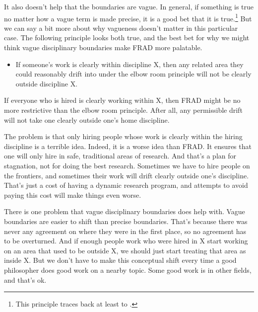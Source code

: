 It also doesn't help that the boundaries are vague. In general, if something is true no matter how a vague term is made precise, it is a good bet that it is true.\footnote{This principle traces back at least to  \citet[Ch. 6]{Keynes1936}.} But we can say a bit more about why vagueness doesn't matter in this particular case. The following principle looks both true, and the best bet for why we might think vague disciplinary boundaries make FRAD more palatable.

\begin{itemize}
\item If someone's work is clearly within discipline X, then any related area they could reasonably drift into under the elbow room principle will not be clearly outside discipline X.

\end{itemize}
If everyone who is hired is clearly working within X, then FRAD might be no more restrictive than the elbow room principle. After all, any permissible drift will not take one clearly outside one's home discipline. 

The problem is that only hiring people whose work is clearly within the hiring discipline is a terrible idea. Indeed, it is a worse idea than FRAD. It ensures that one will only hire in safe, traditional areas of research. And that's a plan for stagnation, not for doing the best research. Sometimes we have to hire people on the frontiers, and sometimes their work will drift clearly outside one's discipline. That's just a cost of having a dynamic research program, and attempts to avoid paying this cost will make things even worse.

There is one problem that vague disciplinary boundaries does help with. Vague boundaries are easier to shift than precise boundaries. That's because there was never any agreement on where they were in the first place, so no agreement has to be overturned. And if enough people work who were hired in X start working on an area that used to be outside X, we should just start treating that area as inside X. But we don't have to make this conceptual shift every time a good philosopher does good work on a nearby topic. Some good work is in other fields, and that's ok.


